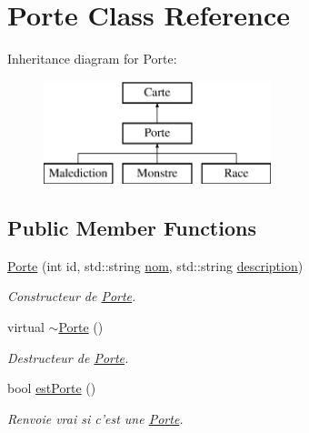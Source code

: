 \hypertarget{class_porte}{\section{Porte Class Reference}
\label{class_porte}
}
Inheritance diagram for Porte\-:\begin{figure}[H]
\begin{center}
\leavevmode
\includegraphics[height=3.000000cm]{class_porte}
\end{center}
\end{figure}
\subsection*{Public Member Functions}
\begin{DoxyCompactItemize}
\item 
\hyperlink{class_porte_af7c81d2889785a946b4074b97365f0d9}{Porte} (int id, std\-::string \hyperlink{class_carte_a46bff2b84b76b6b94b2eaa3fe813ec69}{nom}, std\-::string \hyperlink{class_carte_a5f2acc07fa281fb6d4467c00bd4b1614}{description})
\begin{DoxyCompactList}\small\item\em Constructeur de \hyperlink{class_porte}{Porte}. \end{DoxyCompactList}\item 
\hypertarget{class_porte_a7b82ccac24bfd8b7fa701f7601328d6c}{virtual \hyperlink{class_porte_a7b82ccac24bfd8b7fa701f7601328d6c}{$\sim$\-Porte} ()}\label{class_porte_a7b82ccac24bfd8b7fa701f7601328d6c}

\begin{DoxyCompactList}\small\item\em Destructeur de \hyperlink{class_porte}{Porte}. \end{DoxyCompactList}\item 
bool \hyperlink{class_porte_a8a7e6c7c6b1d94b157b2229a6e32ac93}{est\-Porte} ()
\begin{DoxyCompactList}\small\item\em Renvoie vrai si c'est une \hyperlink{class_porte}{Porte}. \end{DoxyCompactList}\end{DoxyCompactItemize}
